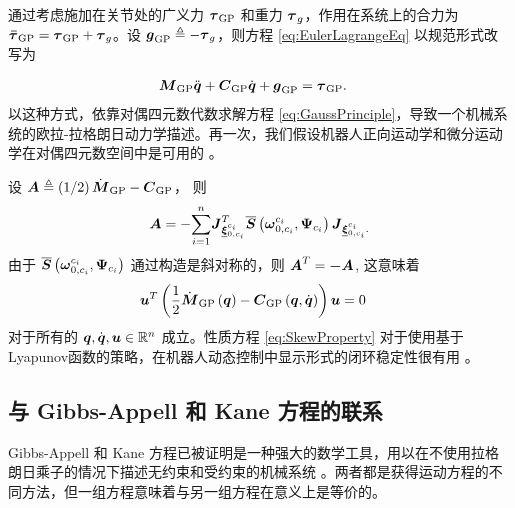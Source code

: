 通过考虑施加在关节处的广义力 $\boldsymbol{\tau}_{\textrm{GP}}$ 和重力 $\boldsymbol{\tau}_{g}$，作用在系统上的合力为 $\boldsymbol{\bar{\tau}}_{\mathrm{GP}}=\boldsymbol{\tau}_{\textrm{GP}}+\boldsymbol{\tau}_{g}$。设 $\boldsymbol{g}_{\textrm{GP}}\triangleq-\boldsymbol{\tau}_{g}$，则方程 \eqref{eq:EulerLagrangeEq} 以规范形式改写为

\begin{align}
\boldsymbol{M}_{\text{GP}}\ddot{\boldsymbol{q}}+\boldsymbol{C}_{\text{GP}}\dot{\boldsymbol{q}}+\boldsymbol{g}_{\textrm{GP}} & =\boldsymbol{\tau}_{\textrm{GP}}.\label{eq:CanonicalEulerLagrange}
\end{align}
以这种方式，依靠对偶四元数代数求解方程 \eqref{eq:GaussPrinciple}，导致一个机械系统的欧拉-拉格朗日动力学描述。再一次，我们假设机器人正向运动学和微分运动学在对偶四元数空间中是可用的 \cite{Adorno2011}。

\begin{remark}

设 $\boldsymbol{A}\triangleq\left(1/2\right)\dot{\boldsymbol{M}}_{\text{GP}}-\boldsymbol{C}_{\text{GP}}$，
则 
\begin{gather*}
\boldsymbol{A}=-\underset{i=1}{\sum^{n}}\boldsymbol{J}_{\underline{\boldsymbol{\xi}}_{0,c_{i}}^{c_{i}}}^{T}\overline{\boldsymbol{S}}\left(\boldsymbol{\omega}_{0,c_{i}}^{c_{i}},\boldsymbol{\Psi}_{c_{i}}\right)\boldsymbol{J}_{\underline{\boldsymbol{\xi}}_{0,c_{i}}^{c_{i}}.}
\end{gather*}
由于 $\overline{\boldsymbol{S}}\left(\boldsymbol{\omega}_{0,c_{i}}^{c_{i}},\boldsymbol{\Psi}_{c_{i}}\right)$
通过构造是斜对称的，则 $\boldsymbol{A}^{T}=\boldsymbol{-A}$,
这意味着
\begin{align}
\boldsymbol{u}^{T}\left(\frac{1}{2}\dot{\boldsymbol{M}}_{\text{GP}}\left(\boldsymbol{q}\right)-\boldsymbol{C}_{\text{GP}}\left(\boldsymbol{q},\dot{\boldsymbol{q}}\right)\right)\boldsymbol{u} & =0\label{eq:SkewProperty}
\end{align}
对于所有的 $\boldsymbol{q},\dot{\boldsymbol{q}},\boldsymbol{u}\in\mathbb{R}^{n}$ 成立。性质方程
\eqref{eq:SkewProperty} 对于使用基于Lyapunov函数的策略，在机器人动态控制中显示形式的闭环稳定性很有用 \cite{Kelly2005}。

\end{remark}


\subsection{\normalfont\bfseries 与 Gibbs-Appell 和 Kane 方程的联系}

Gibbs-Appell 和 Kane 方程已被证明是一种强大的数学工具，用以在不使用拉格朗日乘子的情况下描述无约束和受约束的机械系统 \cite{Storch1989,Honein2021}。两者都是获得运动方程的不同方法，但一组方程意味着与另一组方程在意义上是等价的。\cite{Townsend1992,Desloge1987_,Levinson87}



